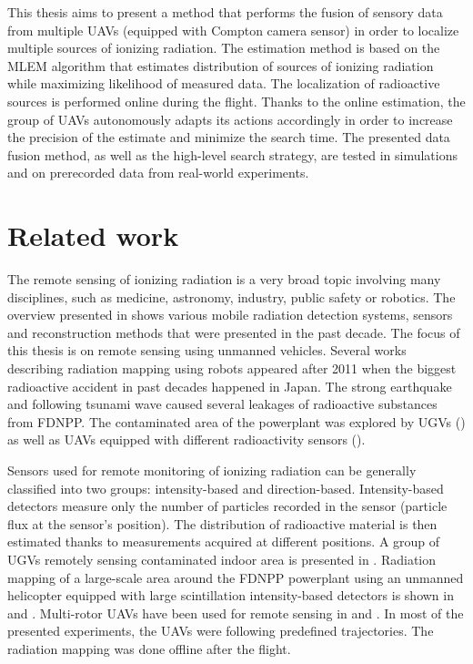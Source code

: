 This thesis aims to present a method that performs the fusion of sensory data from multiple \ac{UAV}s (equipped with Compton camera sensor) in order to localize multiple sources of ionizing radiation.
The estimation method is based on the \ac{MLEM} algorithm that estimates distribution of sources of ionizing radiation while maximizing likelihood of measured data.
The localization of radioactive sources is performed online during the flight.
Thanks to the online estimation, the group of \ac{UAV}s autonomously adapts its actions accordingly  in order to increase the precision of the estimate and minimize the search time.
The presented data fusion method, as well as the high-level search strategy, are tested in simulations and on prerecorded data from real-world experiments.

\section{Related work}
The remote sensing of ionizing radiation is a very broad topic involving many disciplines, such as medicine, astronomy, industry, public safety or robotics.
The overview presented in \cite{radiation_detection_systems_overview} shows various mobile radiation detection systems, sensors and reconstruction methods that were presented in the past decade.
The focus of this thesis is on remote sensing using unmanned vehicles.
Several works describing radiation mapping using robots appeared after 2011 when the biggest radioactive accident in past decades happened in Japan.
The strong earthquake and following tsunami wave caused several leakages of radioactive substances from \ac{FDNPP}.
The contaminated area of the powerplant was explored by \ac{UGV}s (\cite{fuku2012,fuku_compton}) as well as \ac{UAV}s equipped with different radioactivity sensors (\cite{sanada2015, towler2012, Jiang2015, Mochizuki_2017, sato_drone_compton_camera_2018}).

Sensors used for remote monitoring of ionizing radiation can be generally classified into two groups: intensity-based and direction-based.
Intensity-based detectors measure only the number of particles recorded in the sensor (particle flux at the sensor's position).
The distribution of radioactive material is then estimated thanks to measurements acquired at different positions.
A group of \ac{UGV}s remotely sensing contaminated indoor area is presented in \cite{fuku2012}.
Radiation mapping of a large-scale area around the \ac{FDNPP} powerplant using an unmanned helicopter equipped with large scintillation intensity-based detectors is shown in \cite{sanada2015} and \cite{towler2012}.
Multi-rotor \ac{UAV}s have been used for remote sensing in \cite{nine_drone_fukushima, ten_remote_sensing_with_uderstanding_uav_ugv} and \cite{eleven_remote_sensing_non_japan}.
In most of the presented experiments, the \ac{UAV}s were following predefined trajectories.
The radiation mapping was done offline after the flight.

